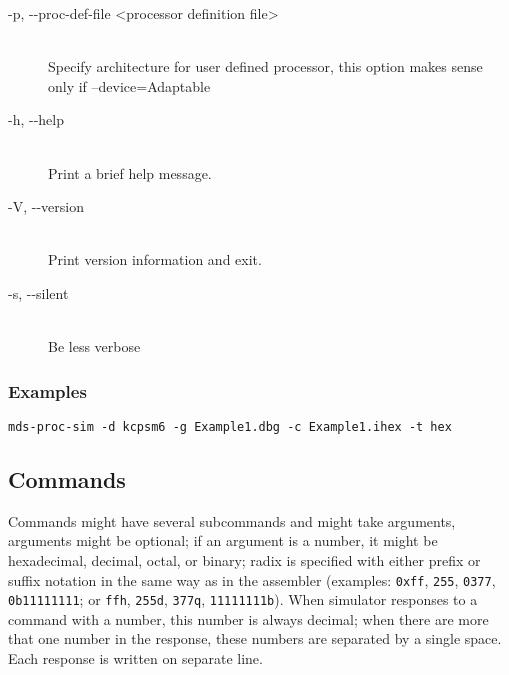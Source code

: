 \begin{description}
                \item[-p, -{}-proc-def-file <processor definition file>]~\\
                    Specify architecture for user defined processor, this option makes sense only if --device=Adaptable

                \item[-h, -{}-help]~\\
                    Print a brief help message.

                \item[-V, -{}-version]~\\
                    Print version information and exit.

                \item[-s, -{}-silent]~\\
                    Be less verbose
            \end{description}

        \subsubsection{Examples}
            \verb'mds-proc-sim -d kcpsm6 -g Example1.dbg -c Example1.ihex -t hex'

    \subsection{Commands}
        Commands might have several subcommands and might take arguments, arguments might be optional; if an argument is a number, it might be hexadecimal, decimal, octal, or binary; radix is specified with either prefix or suffix notation in the same way as in the assembler (examples: \texttt{0xff}, \texttt{255}, \texttt{0377}, \texttt{0b11111111}; or \texttt{ffh}, \texttt{255d}, \texttt{377q}, \texttt{11111111b}). When simulator responses to a command with a number, this number is always decimal; when there are more that one number in the response, these numbers are separated by a single space. Each response is written on separate line.


